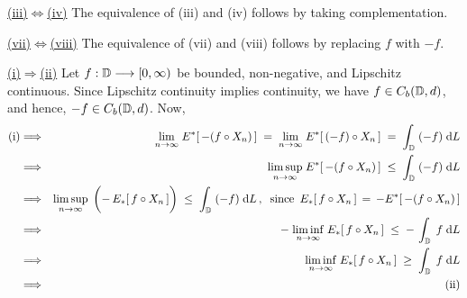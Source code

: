 
\vskip 0.5cm \noindent
\underline{(iii)\;$\Longleftrightarrow$\;(iv)}
\vskip 0.2cm \noindent
The equivalence of (iii) and (iv) follows by taking complementation.

\vskip 0.5cm \noindent
\underline{(vii)\;$\Longleftrightarrow$\;(viii)}
\vskip 0.2cm \noindent
The equivalence of (vii) and (viii) follows by replacing $f$ with $-f$.

\vskip 0.5cm
\noindent
\underline{(i)\;$\Longrightarrow$\;(ii)}
\vskip 0.2cm \noindent
Let $f : \mathbb{D} \longrightarrow [0,\infty)$ be bounded, non-negative, and Lipschitz continuous.
Since Lipschitz continuity implies continuity, we have $f \in C_{b}(\mathbb{D},d)$, and hence, $-f \in C_{b}(\mathbb{D},d)$.
Now,
\begin{eqnarray*}
\textnormal{(i)}
&\Longrightarrow&
	{\color{white}1}\underset{n\rightarrow\infty}{\lim}\;E^{*}\!\left[\,-(f \circ X_{n})\,\right]
	\;=\; \underset{n\rightarrow\infty}{\lim}\;E^{*}\!\left[\,(-f) \circ X_{n}\,\right]
	\;=\; \int_{\D}\;(-f)\;\d L
\\
&\Longrightarrow&
	\underset{n\rightarrow\infty}{\limsup}\;E^{*}\!\left[\,-(f \circ X_{n})\,\right] \;\leq\; \int_{\D}\;(-f)\;\d L
\\
&\Longrightarrow&
	\underset{n\rightarrow\infty}{\limsup}\;
	\left(\overset{{\color{white}\vert}}{-}\,E_{*}\!\left[\,f \circ X_{n}\,\right]\right) \;\leq\; \int_{\D}\;(-f)\;\d L\,,
	\;\;\textnormal{since \,$E_{*}[\,f \circ X_{n}\,] \,=\, -E^{*}[\,-(f \circ X_{n})\,]$}
\\
&\Longrightarrow&
	-\;\underset{n\rightarrow\infty}{\liminf}\;E_{*}\!\left[\,f \circ X_{n}\,\right]
	\;\leq\; -\,\int_{\D}\;f\;\d L
\\
&\Longrightarrow&
	\underset{n\rightarrow\infty}{\liminf}\;E_{*}\!\left[\,f \circ X_{n}\,\right]
	\;\geq\; \int_{\D}\;f\;\d L
\\
&\Longrightarrow&
	\textnormal{(ii)}
\end{eqnarray*}

